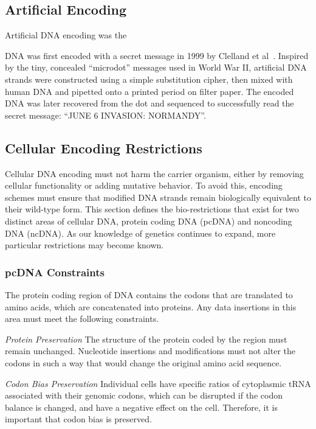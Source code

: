 \documentclass[USenglish,oneside,twocolumn]{article}
\begin{document}
\subsection{Artificial Encoding}

 Artificial DNA encoding was the

 DNA was first encoded with a secret message in 1999 by Clelland et al~\cite{CRB1999N}. Inspired by the tiny, concealed “microdot” messages used in World War II, artificial DNA strands were constructed using a simple substitution cipher, then mixed with human DNA and pipetted onto a printed period on filter paper. The encoded DNA was later recovered from the dot and sequenced to successfully read the secret message: “JUNE 6 INVASION: NORMANDY”.



\subsection{Cellular Encoding Restrictions}

Cellular DNA encoding must not harm the carrier organism, either by removing cellular functionality or adding mutative behavior. To avoid this, encoding schemes must ensure that modified DNA strands remain biologically equivalent to their wild-type form. This section defines the bio-restrictions that exist for two distinct areas of cellular DNA, protein coding DNA (pcDNA) and noncoding DNA (ncDNA). As our knowledge of genetics continues to expand, more particular restrictions may become known.

\subsubsection{pcDNA Constraints}

The protein coding region of DNA contains the codons that are translated to amino acids, which are concatenated into proteins. Any data insertions in this area must meet the following constraints.

\textit{Protein Preservation} The structure of the protein coded by the region must remain unchanged. Nucleotide insertions and modifications must not alter the codons in such a way that would change the original amino acid sequence.

\textit{Codon Bias Preservation} Individual cells have specific ratios of cytoplasmic tRNA associated with their genomic codons, which can be disrupted if the codon balance is changed, and have a negative effect on the cell. Therefore, it is important that codon bias is preserved.
\end{document}
